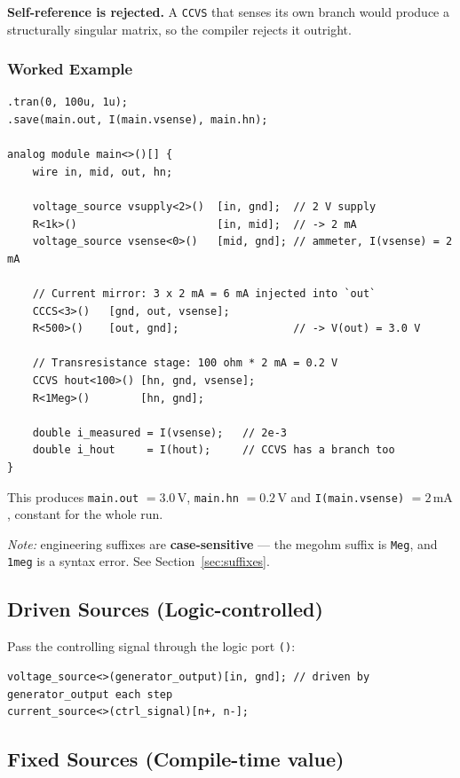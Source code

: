 \documentclass[11pt, a4paper]{article}
\newcommand{\code}[1]{\texttt{\small #1}}
\begin{document}
\textbf{Self-reference is rejected.} A \code{CCVS} that senses its own branch
would produce a structurally singular matrix, so the compiler rejects it
outright.

\subsubsection{Worked Example}

\begin{lstlisting}
.tran(0, 100u, 1u);
.save(main.out, I(main.vsense), main.hn);

analog module main<>()[] {
    wire in, mid, out, hn;

    voltage_source vsupply<2>()  [in, gnd];  // 2 V supply
    R<1k>()                      [in, mid];  // -> 2 mA
    voltage_source vsense<0>()   [mid, gnd]; // ammeter, I(vsense) = 2 mA

    // Current mirror: 3 x 2 mA = 6 mA injected into `out`
    CCCS<3>()   [gnd, out, vsense];
    R<500>()    [out, gnd];                  // -> V(out) = 3.0 V

    // Transresistance stage: 100 ohm * 2 mA = 0.2 V
    CCVS hout<100>() [hn, gnd, vsense];
    R<1Meg>()        [hn, gnd];

    double i_measured = I(vsense);   // 2e-3
    double i_hout     = I(hout);     // CCVS has a branch too
}
\end{lstlisting}

\noindent This produces \code{main.out} \(= 3.0\,\text{V}\), \code{main.hn}
\(= 0.2\,\text{V}\) and \code{I(main.vsense)} \(= 2\,\text{mA}\), constant for
the whole run.

\textit{Note:} engineering suffixes are \textbf{case-sensitive} --- the
megohm suffix is \code{Meg}, and \code{1meg} is a syntax error. See
Section~\ref{sec:suffixes}.

\subsection{Driven Sources (Logic-controlled)}

Pass the controlling signal through the logic port \code{()}:

\begin{lstlisting}
voltage_source<>(generator_output)[in, gnd]; // driven by generator_output each step
current_source<>(ctrl_signal)[n+, n-];
\end{lstlisting}

\subsection{Fixed Sources (Compile-time value)}
\end{document}
